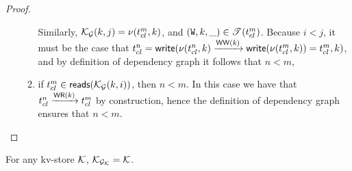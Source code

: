 \begin{proof}
\begin{enumerate}[(i)]
\begin{enumerate}
Similarly, $\mathcal{K}_{\mathcal{G}}(k, j) = \nu(t_{{cl}}^{m}, k)$, and $(\texttt{W}, k, \_) \in \mathscr{T}(t_{{cl}}^{m})$. 
Because $i < j$, it must be the case that $t_{{cl}}^{n} = \mathsf{write}(\nu(t_{{cl}}^{n}, k) \xrightarrow{\mathsf{WW}(k)} 
\mathsf{write}(\nu(t_{{cl}}^{m}, k)) = t_{{cl}}^{m}, k)$, and by definition of dependency graph it follows that 
$n < m$, 
\item if $t_{{cl}}^{m} \in \mathsf{reads}(\mathcal{K}_{\mathcal{G}}(k, i))$, then $n < m$. In this case we have that 
$t_{{cl}}^{n} \xrightarrow{\mathsf{WR}(k)} t_{{cl}}^{m}$ by construction, hence the definition 
of dependency graph ensures that $n < m$. 
\end{enumerate}
\end{enumerate}
\end{proof}

\begin{proposition}
    \label{prop:bijection:mkvs-dgraph}
For any kv-store $\mathcal{K}$, $\mathcal{K}_{\mathcal{G}_{\mathcal{K}}} = \mathcal{K}$.
\end{proposition}
